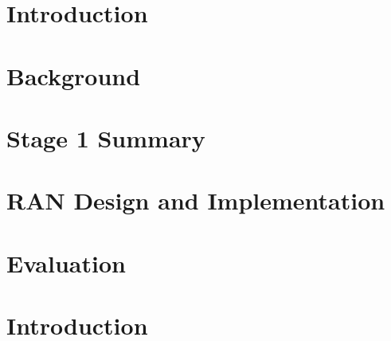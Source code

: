 \documentclass[a4paper,12pt]{report}
\renewcommand{\headrulewidth}{0pt}
\begin{document}
\fancyfoot[CO]{\thepage}

\newpage
\setcounter{page}{3}
% 
% 	
% 
\tableofcontents
\listoffigures
\newpage
{}
\fancyhead[RO]{\thepage}
\fancyhead[LO]{\slshape \leftmark}
\fancyfoot[CO]{}
\renewcommand{\headrulewidth}{0.5pt}
\chapter{Introduction \label{chap:Introduction}}


\chapter{Background \label{chap:Background}}


\chapter{Stage 1 Summary\label{chap:UPFRTC}}


\chapter{RAN Design and Implementation\label{chap:RANDesignandImplementation}}


\chapter{Evaluation\label{chap:Evaluation}}




\chapter{Introduction \label{chap:Introduction}}

\end{document}

